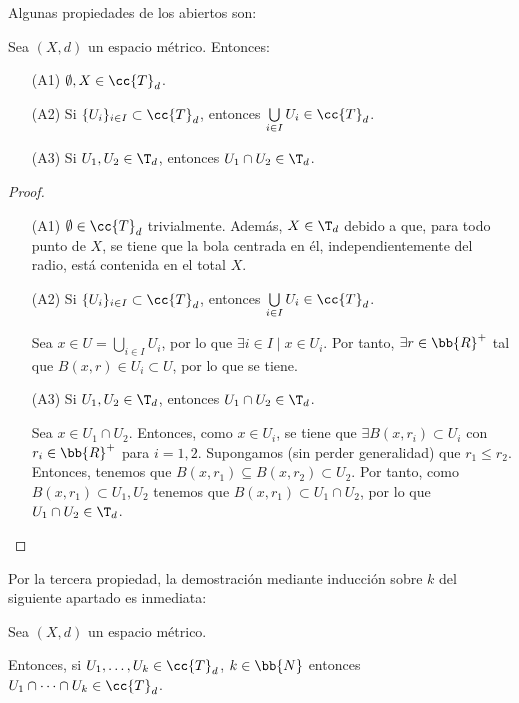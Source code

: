 Algunas propiedades de los abiertos son:
\begin{prop} Sea $(X,d)$ un espacio métrico. Entonces:
    \begin{enumerate}
        \item[(A1)] $\emptyset, X\in \cc{T}_d$.
        \item[(A2)] Si $\{U_i\}_{i\in I}\subset \cc{T}_d$, entonces $ \bigcup\limits_{i\in I} U_i\in \cc{T}_d$.
        \item[(A3)] Si $U_1,U_2\in \T_d$, entonces $U_1\cap U_2\in \T_d$.
    \end{enumerate}
\end{prop}
\begin{proof}\
\begin{enumerate}
        \item[(A1)] $\emptyset\in \cc{T}_d$ trivialmente. Además, $X\in \T_d$ debido a que, para todo punto de $X$, se tiene que la bola centrada en él, independientemente del radio, está contenida en el total $X$.
        
        \item[(A2)] Si $\{U_i\}_{i\in I}\subset \cc{T}_d$, entonces $ \bigcup\limits_{i\in I}U_i \in \cc{T}_d$.

        Sea $x\in U=\bigcup\limits_{i\in I}U_i$, por lo que $\exists i\in I\mid x\in U_i$. Por tanto, $\exists r\in \bb{R}^+ $ tal que $ B(x,r)\in U_i\subset U$, por lo que se tiene.
        
        \item[(A3)] Si $U_1,U_2\in \T_d$, entonces $U_1\cap U_2\in \T_d$.

        Sea $x\in U_1\cap U_2$. Entonces, como $x\in U_i$, se tiene que $\exists B(x, r_i)\subset U_i$ con $r_i\in \bb{R}^+$ para $i=1,2$. Supongamos (sin perder generalidad) que $r_1\leq r_2$. Entonces, tenemos que $B(x,r_1)\subseteq B(x,r_2)\subset U_2$. Por tanto, como $B(x,r_1)\subset U_1,U_2$ tenemos que $B(x,r_1)\subset U_1\cap U_2$, por lo que $U_1\cap U_2\in \T_d$.
    \end{enumerate}
\end{proof}

Por la tercera propiedad, la demostración mediante inducción sobre $k$ del siguiente apartado es inmediata:
\begin{coro}
    Sea $(X,d)$ un espacio métrico.
    
    Entonces, si $U_1,\dots, U_k \in \cc{T}_d$, $k\in \bb{N}$ entonces $U_1\cap \dots \cap U_k\in \cc{T}_d$.
\end{coro}

